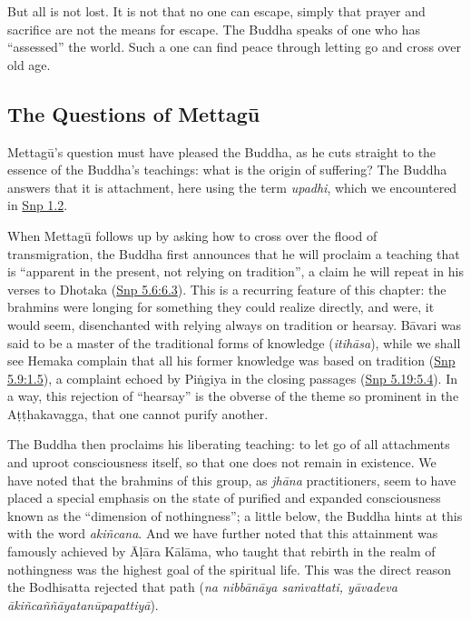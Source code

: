\documentclass[12pt,openany]{book}%
\begin{document}
But all is not lost. It is not that no one can escape, simply that prayer and sacrifice are not the means for escape. The Buddha speaks of one who has “assessed” the world. Such a one can find peace through letting go and cross over old age.

\subsection*{The Questions of \textsanskrit{Mettagū}}

\textsanskrit{Mettagū}’s question must have pleased the Buddha, as he cuts straight to the essence of the Buddha’s teachings: what is the origin of suffering? The Buddha answers that it is attachment, here using the term \textit{upadhi}, which we encountered in \href{https://suttacentral.net/snp1.2/en/sujato}{Snp 1.2}.

When \textsanskrit{Mettagū} follows up by asking how to cross over the flood of transmigration, the Buddha first announces that he will proclaim a teaching that is “apparent in the present, not relying on tradition”, a claim he will repeat in his verses to Dhotaka (\href{https://suttacentral.net/snp5.6/en/sujato\#6.3}{Snp 5.6:6.3}). This is a recurring feature of this chapter: the brahmins were longing for something they could realize directly, and were, it would seem, disenchanted with relying always on tradition or hearsay. \textsanskrit{Bāvari} was said to be a master of the traditional forms of knowledge (\textit{\textsanskrit{itihāsa}}), while we shall see Hemaka complain that all his former knowledge was based on tradition (\href{https://suttacentral.net/snp5.9/en/sujato\#1.5}{Snp 5.9:1.5}), a complaint echoed by \textsanskrit{Piṅgiya} in the closing passages (\href{https://suttacentral.net/snp5.19/en/sujato\#5.4}{Snp 5.19:5.4}). In a way, this rejection of “hearsay” is the obverse of the theme so prominent in the \textsanskrit{Aṭṭhakavagga}, that one cannot purify another.

The Buddha then proclaims his liberating teaching: to let go of all attachments and uproot consciousness itself, so that one does not remain in existence. We have noted that the brahmins of this group, as \textit{\textsanskrit{jhāna}} practitioners, seem to have placed a special emphasis on the state of purified and expanded consciousness known as the “dimension of nothingness”; a little below, the Buddha hints at this with the word \textit{\textsanskrit{akiñcana}}. And we have further noted that this attainment was famously achieved by \textsanskrit{Āḷāra} \textsanskrit{Kālāma}, who taught that rebirth in the realm of nothingness was the highest goal of the spiritual life. This was the direct reason the Bodhisatta rejected that path (\textit{na \textsanskrit{nibbānāya} \textsanskrit{saṁvattati}, \textsanskrit{yāvadeva} \textsanskrit{ākiñcaññāyatanūpapattiyā}}).
\end{document}
